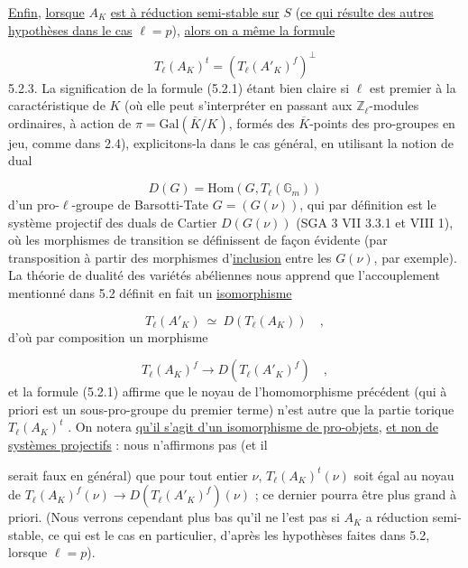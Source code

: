 
\underline{Enfin}, \underline{lorsque} $A_K$ \underline{est à réduction semi-stable sur} $S$ (\underline{ce qui résulte des autres hypothèses dans le cas} $\ell = p$), \underline{alors on a même la formule}

\begin{equation}\tag{5.2.2}
T_\ell(A_K)^t = (T_\ell(A'_K)^f)^\perp
\end{equation}
5.2.3. La signification de la formule (5.2.1) étant bien claire si $\ell$ est premier à la caractéristique de $K$ (où elle peut s'interpréter en passant aux $\mathbb{Z}_\ell$-modules ordinaires, à action de $\pi = \mathrm{Gal}(\overline{K}/K)$, formés des $\overline{K}$-points des pro-groupes en jeu, comme dans 2.4), explicitons-la dans le cas général, en utilisant la notion de dual

\begin{equation}\tag{5.2.3.1}
D(G) = \mathrm{Hom}(G,T_\ell(\mathbb{G}_m))
\end{equation}
d'un pro-$\ell$-groupe de Barsotti-Tate $G = (G(\nu))$, qui par définition est le système projectif des duals de Cartier $D(G(\nu))$ (SGA 3 VII 3.3.1 et VIII 1), où les morphismes de transition se définissent de façon évidente (par transposition à partir des morphismes d'\underline{inclusion} entre les $G(\nu)$, par exemple). La théorie de dualité des variétés abéliennes nous apprend que l'accouplement mentionné dans 5.2 définit en fait un \underline{isomorphisme}

\begin{equation}\tag{5.2.3.2}
T_\ell(A'_K) \ \simeq \ D(T_\ell(A_K)) \quad ,
\end{equation}
d'où par composition un morphisme

\begin{equation}\tag{5.2.3.3}
T_\ell(A_K)^f \longrightarrow D(T_\ell(A'_K)^f) \quad ,
\end{equation}
et la formule (5.2.1) affirme que le noyau de l'homomorphisme précédent (qui à priori est un sous-pro-groupe du premier terme) n'est autre que la partie torique $T_\ell(A_K)^t$ . On notera \underline{qu'il s'agit d'un isomorphisme de pro-objets}, \underline{et non de systèmes projectifs} : nous n'affirmons pas (et il



serait faux en général) que pour tout entier $\nu$, $T_\ell(A_K)^t(\nu)$ soit égal au noyau de $T_\ell(A_K)^f(\nu) \longrightarrow D(T_\ell(A'_K)^f)(\nu)$ ; ce dernier pourra être plus grand à priori. (Nous verrons cependant plus bas qu'il ne l'est pas si $A_K$ a réduction semi-stable, ce qui est le cas en particulier, d'après les hypothèses faites dans 5.2, lorsque $\ell = p$).


